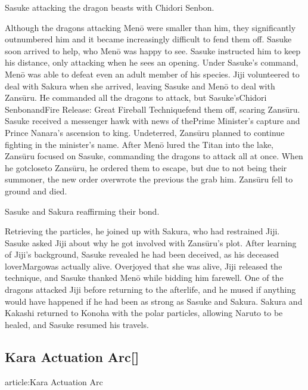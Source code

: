 \documentclass[a4paper,12pt]{article}
\begin{document}
Sasuke attacking the dragon beasts with Chidori Senbon.\\ \par \vspace{0.5cm}

Although the dragons attacking Menō were smaller than him, they significantly outnumbered him and it became increasingly difficult to fend them off. Sasuke soon arrived to help, who Menō was happy to see. Sasuke instructed him to keep his distance, only attacking when he sees an opening. Under Sasuke's command, Menō was able to defeat even an adult member of his species. Jiji volunteered to deal with Sakura when she arrived, leaving Sasuke and Menō to deal with Zansūru. He commanded all the dragons to attack, but Sasuke'sChidori SenbonandFire Release: Great Fireball Techniquefend them off, scaring Zansūru. Sasuke received a messenger hawk with news of thePrime Minister's capture and Prince Nanara's ascension to king. Undeterred, Zansūru planned to continue fighting in the minister's name. After Menō lured the Titan into the lake, Zansūru focused on Sasuke, commanding the dragons to attack all at once. When he gotcloseto Zansūru, he ordered them to escape, but due to not being their summoner, the new order overwrote the previous the grab him. Zansūru fell to ground and died.\\ \par \vspace{0.5cm}

Sasuke and Sakura reaffirming their bond.\\ \par \vspace{0.5cm}

Retrieving the particles, he joined up with Sakura, who had restrained Jiji. Sasuke asked Jiji about why he got involved with Zansūru's plot. After learning of Jiji's background, Sasuke revealed he had been deceived, as his deceased loverMargowas actually alive. Overjoyed that she was alive, Jiji released the technique, and Sasuke thanked Menō while bidding him farewell. One of the dragons attacked Jiji before returning to the afterlife, and he mused if anything would have happened if he had been as strong as Sasuke and Sakura. Sakura and Kakashi returned to Konoha with the polar particles, allowing Naruto to be healed, and Sasuke resumed his travels.\\ \par \vspace{0.5cm}

\subsection*{Kara Actuation Arc[]}\n\nMain article:Kara Actuation Arc\\ \par \vspace{0.5cm}
\end{document}
